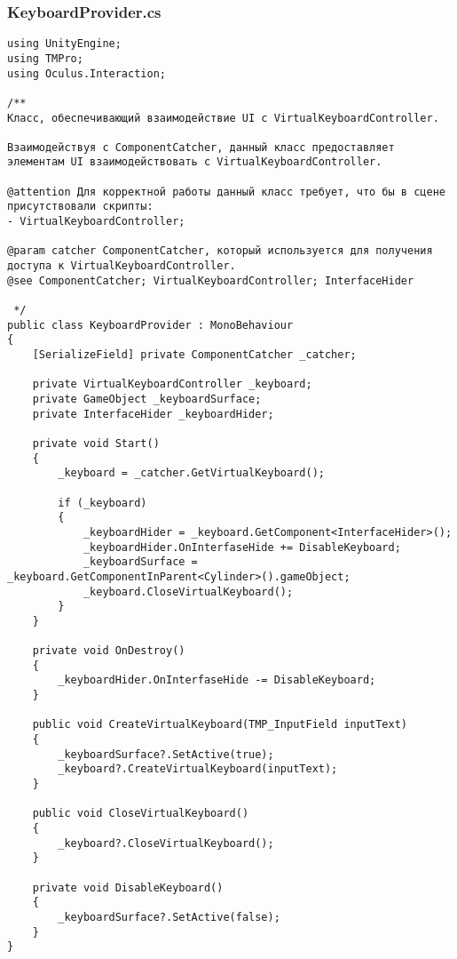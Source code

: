 \subsubsection*{KeyboardProvider.cs}
\begin{verbatim}
﻿using UnityEngine;
using TMPro;
using Oculus.Interaction;

/**
Класс, обеспечивающий взаимодействие UI с VirtualKeyboardController.

Взаимодействуя с ComponentCatcher, данный класс предоставляет элементам UI взаимодействовать с VirtualKeyboardController.

@attention Для корректной работы данный класс требует, что бы в сцене присутствовали скрипты:
- VirtualKeyboardController;

@param catcher ComponentCatcher, который используется для получения доступа к VirtualKeyboardController.
@see ComponentCatcher; VirtualKeyboardController; InterfaceHider

 */
public class KeyboardProvider : MonoBehaviour
{
    [SerializeField] private ComponentCatcher _catcher;

    private VirtualKeyboardController _keyboard;
    private GameObject _keyboardSurface;
    private InterfaceHider _keyboardHider;

    private void Start()
    {
        _keyboard = _catcher.GetVirtualKeyboard();

        if (_keyboard)
        {
            _keyboardHider = _keyboard.GetComponent<InterfaceHider>();
            _keyboardHider.OnInterfaseHide += DisableKeyboard;
            _keyboardSurface = _keyboard.GetComponentInParent<Cylinder>().gameObject;
            _keyboard.CloseVirtualKeyboard();
        }
    }

    private void OnDestroy()
    {
        _keyboardHider.OnInterfaseHide -= DisableKeyboard;
    }

    public void CreateVirtualKeyboard(TMP_InputField inputText)
    {
        _keyboardSurface?.SetActive(true);
        _keyboard?.CreateVirtualKeyboard(inputText);
    }

    public void CloseVirtualKeyboard()
    {
        _keyboard?.CloseVirtualKeyboard();
    }

    private void DisableKeyboard()
    {
        _keyboardSurface?.SetActive(false);
    }
}

\end{verbatim}
